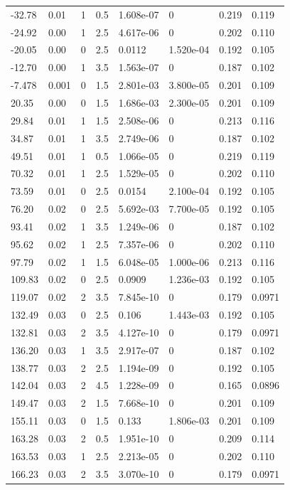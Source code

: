 \documentclass[preview]{standalone}
\begin{document}
{{\begin{tabular}{L{1.2cm}C{1.2cm} C{0.3cm}C{0.5cm} C{1.4cm}C{1.4cm} C{1.4cm}C{1.4cm}}
  -32.78  &  0.01  & 1     & 0.5 &  1.608e-07  & 0  & 0.219 &  0.119   \\ 
  -24.92  &  0.00  & 1     & 2.5 &  4.617e-06  & 0  & 0.202 &  0.110   \\ 
  -20.05  &  0.00  & 0     & 2.5 &  0.0112  & 1.520e-04  & 0.192 &  0.105   \\ 
  -12.70  &  0.00  & 1     & 3.5 &  1.563e-07  & 0  & 0.187 &  0.102   \\ 
  -7.478  &  0.001  & 0     & 1.5 &  2.801e-03  & 3.800e-05  & 0.201 &  0.109   \\ 
  20.35  &  0.00  & 0     & 1.5 &  1.686e-03  & 2.300e-05  & 0.201 &  0.109   \\ 
  29.84  &  0.01  & 1     & 1.5 &  2.508e-06  & 0  & 0.213 &  0.116   \\ 
  34.87  &  0.01  & 1     & 3.5 &  2.749e-06  & 0  & 0.187 &  0.102   \\ 
  49.51  &  0.01  & 1     & 0.5 &  1.066e-05  & 0  & 0.219 &  0.119   \\ 
  70.32  &  0.01  & 1     & 2.5 &  1.529e-05  & 0  & 0.202 &  0.110   \\ 
  73.59  &  0.01  & 0     & 2.5 &  0.0154  & 2.100e-04  & 0.192 &  0.105   \\ 
  76.20  &  0.02  & 0     & 2.5 &  5.692e-03  & 7.700e-05  & 0.192 &  0.105   \\ 
  93.41  &  0.02  & 1     & 3.5 &  1.249e-06  & 0  & 0.187 &  0.102   \\ 
  95.62  &  0.02  & 1     & 2.5 &  7.357e-06  & 0  & 0.202 &  0.110   \\ 
  97.79  &  0.02  & 1     & 1.5 &  6.048e-05  & 1.000e-06  & 0.213 &  0.116   \\ 
  109.83  &  0.02  & 0     & 2.5 &  0.0909  & 1.236e-03  & 0.192 &  0.105   \\ 
  119.07  &  0.02  & 2     & 3.5 &  7.845e-10  & 0  & 0.179 &  0.0971   \\ 
  132.49  &  0.03  & 0     & 2.5 &  0.106  & 1.443e-03  & 0.192 &  0.105   \\ 
  132.81  &  0.03  & 2     & 3.5 &  4.127e-10  & 0  & 0.179 &  0.0971   \\ 
  136.20  &  0.03  & 1     & 3.5 &  2.917e-07  & 0  & 0.187 &  0.102   \\ 
  138.77  &  0.03  & 2     & 2.5 &  1.194e-09  & 0  & 0.192 &  0.105   \\ 
  142.04  &  0.03  & 2     & 4.5 &  1.228e-09  & 0  & 0.165 &  0.0896   \\ 
  149.47  &  0.03  & 2     & 1.5 &  7.668e-10  & 0  & 0.201 &  0.109   \\ 
  155.11  &  0.03  & 0     & 1.5 &  0.133  & 1.806e-03  & 0.201 &  0.109   \\ 
  163.28  &  0.03  & 2     & 0.5 &  1.951e-10  & 0  & 0.209 &  0.114   \\ 
  163.53  &  0.03  & 1     & 2.5 &  2.213e-05  & 0  & 0.202 &  0.110   \\ 
  166.23  &  0.03  & 2     & 3.5 &  3.070e-10  & 0  & 0.179 &  0.0971   \\ 
\hline 
\end{tabular} 

}}
\end{document}
